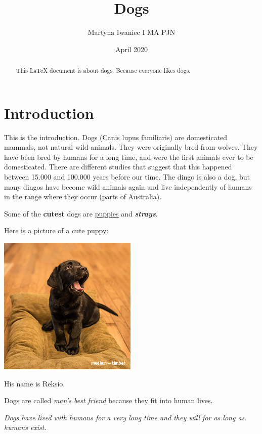 \documentclass[12pt, letterpaper, twoside]{article}
\title{Dogs}
\author{Martyna Iwaniec I MA PJN}
\date{April 2020 }
\begin{document}
\maketitle
\begin{abstract}
This \LaTeX{} document is about dogs. Because everyone likes dogs.
\end{abstract}

\tableofcontents
 
\section{Introduction}
This is the introduction. Dogs (Canis lupus familiaris) are domesticated mammals, not natural wild animals. They were originally bred from wolves. They have been bred by humans for a long time, and were the first animals ever to be domesticated. There are different studies that suggest that this happened between 15.000 and 100.000 years before our time. The dingo is also a dog, but many dingos have become wild animals again and live independently of humans in the range where they occur (parts of Australia).

 
Some of the \textbf{cutest}
dogs are \underline{puppies} 
and \textbf{\textit{strays}}.

Here is a picture of a cute puppy:
\begin{center}
\includegraphics{puppy}
 
His name is Reksio.
\end{center}

Dogs are called \emph{man's best friend} 
because they fit into human lives.

\textit{Dogs have lived with humans \emph{for a very long time} 
and
they will for as long as humans exist.}
\end{document}
